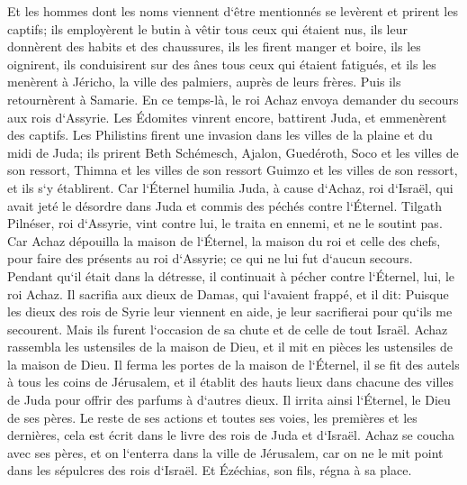 \verse Et les hommes dont les noms viennent d`être mentionnés se levèrent et prirent les captifs; ils employèrent le butin à vêtir tous ceux qui étaient nus, ils leur donnèrent des habits et des chaussures, ils les firent manger et boire, ils les oignirent, ils conduisirent sur des ânes tous ceux qui étaient fatigués, et ils les menèrent à Jéricho, la ville des palmiers, auprès de leurs frères. Puis ils retournèrent à Samarie. 
\verse En ce temps-là, le roi Achaz envoya demander du secours aux rois d`Assyrie. 
\verse Les Édomites vinrent encore, battirent Juda, et emmenèrent des captifs. 
\verse Les Philistins firent une invasion dans les villes de la plaine et du midi de Juda; ils prirent Beth Schémesch, Ajalon, Guedéroth, Soco et les villes de son ressort, Thimna et les villes de son ressort Guimzo et les villes de son ressort, et ils s`y établirent. 
\verse Car l`Éternel humilia Juda, à cause d`Achaz, roi d`Israël, qui avait jeté le désordre dans Juda et commis des péchés contre l`Éternel. 
\verse Tilgath Pilnéser, roi d`Assyrie, vint contre lui, le traita en ennemi, et ne le soutint pas. 
\verse Car Achaz dépouilla la maison de l`Éternel, la maison du roi et celle des chefs, pour faire des présents au roi d`Assyrie; ce qui ne lui fut d`aucun secours. 
\verse Pendant qu`il était dans la détresse, il continuait à pécher contre l`Éternel, lui, le roi Achaz. 
\verse Il sacrifia aux dieux de Damas, qui l`avaient frappé, et il dit: Puisque les dieux des rois de Syrie leur viennent en aide, je leur sacrifierai pour qu`ils me secourent. Mais ils furent l`occasion de sa chute et de celle de tout Israël. 
\verse Achaz rassembla les ustensiles de la maison de Dieu, et il mit en pièces les ustensiles de la maison de Dieu. Il ferma les portes de la maison de l`Éternel, il se fit des autels à tous les coins de Jérusalem, 
\verse et il établit des hauts lieux dans chacune des villes de Juda pour offrir des parfums à d`autres dieux. Il irrita ainsi l`Éternel, le Dieu de ses pères. 
\verse Le reste de ses actions et toutes ses voies, les premières et les dernières, cela est écrit dans le livre des rois de Juda et d`Israël. 
\verse Achaz se coucha avec ses pères, et on l`enterra dans la ville de Jérusalem, car on ne le mit point dans les sépulcres des rois d`Israël. Et Ézéchias, son fils, régna à sa place. 

